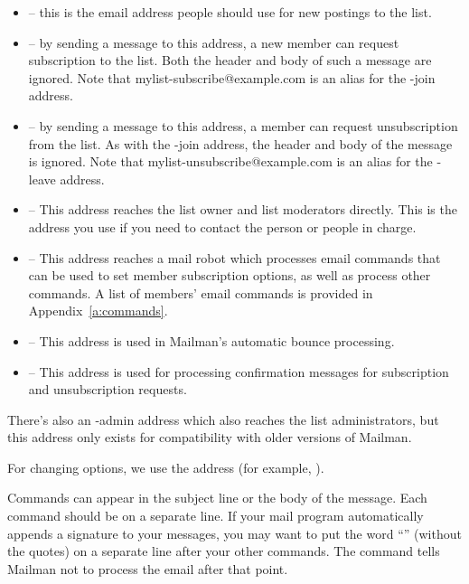 \documentclass{howto}
\begin{document}
\begin{itemize}
\item {} -- this is the email address people should
      use for new postings to the list.

\item {} -- by sending a message to this address,
      a new member can request subscription to the list.  Both the
       header and body of such a message are
      ignored.  Note that mylist-subscribe@example.com is an alias for
      the -join address.

\item {} -- by sending a message to this address,
      a member can request unsubscription from the list.  As with the
      -join address, the  header and body of the
      message is ignored.  Note that mylist-unsubscribe@example.com is
      an alias for the -leave address.

\item {} -- This address reaches the list owner
      and list moderators directly.  This is the address you use if 
		you need to contact the person or people in charge.

\item {} -- This address reaches a mail robot
      which processes email commands that can be used to set member
      subscription options, as well as process other commands.
      A list of members' email commands is provided in 
		Appendix~\ref{a:commands}.

\item {} -- This address is used in 
		Mailman's automatic bounce processing.

\item {} -- This address is used for
      processing confirmation messages for subscription
      and unsubscription requests.
\end{itemize}

There's also an -admin address which also reaches the list administrators,
but this address only exists for compatibility with older versions of
Mailman.

For changing options, we use the 
address (for example, ).

Commands can appear in the subject line or the body of the message.  Each 
command should be on a separate line.  If your mail program automatically
appends a signature to your messages, you may want to put the word
``'' (without the quotes) on a separate line after your other commands. 
The  command tells Mailman not to process the email after that
point.
\end{document}
